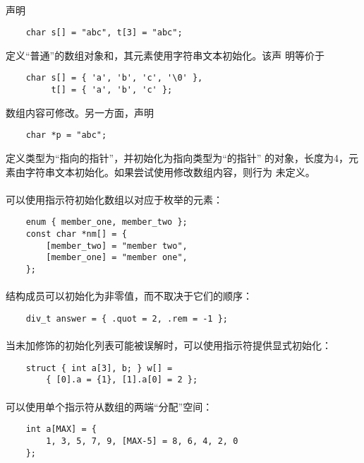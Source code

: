 {\paragraph{}
\ex 声明
\begin{lstlisting}
    char s[] = "abc", t[3] = "abc";
\end{lstlisting}
定义``普通''的数组对象和，其元素使用字符串文本初始化。该声
明等价于
\begin{lstlisting}
    char s[] = { 'a', 'b', 'c', '\0' },
         t[] = { 'a', 'b', 'c' };
\end{lstlisting}
数组内容可修改。另一方面，声明
\begin{lstlisting}
    char *p = "abc";
\end{lstlisting}
定义类型为``指向的指针''，并初始化为指向类型为``的指针''
的对象，长度为4，元素由字符串文本初始化。如果尝试使用修改数组内容，则行为
未定义。

\paragraph{}
\ex 可以使用指示符初始化数组以对应于枚举的元素：
\begin{lstlisting}
    enum { member_one, member_two };
    const char *nm[] = {
        [member_two] = "member two",
        [member_one] = "member one",
    };
\end{lstlisting}

\paragraph{}
\ex 结构成员可以初始化为非零值，而不取决于它们的顺序：
\begin{lstlisting}
    div_t answer = { .quot = 2, .rem = -1 };
\end{lstlisting}

\paragraph{}
\ex 当未加修饰的初始化列表可能被误解时，可以使用指示符提供显式初始化：
\begin{lstlisting}
    struct { int a[3], b; } w[] =
        { [0].a = {1}, [1].a[0] = 2 };
\end{lstlisting}

\paragraph{}
\ex 可以使用单个指示符从数组的两端``分配''空间：
\begin{lstlisting}
    int a[MAX] = {
        1, 3, 5, 7, 9, [MAX-5] = 8, 6, 4, 2, 0
    };
\end{lstlisting}

}
